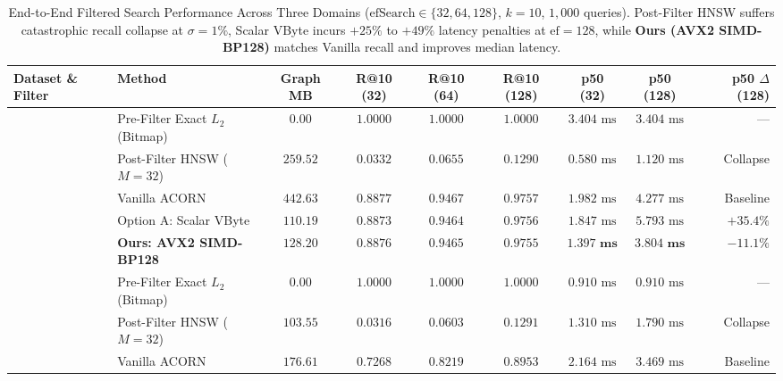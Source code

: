 \begin{table}[t]
\centering
\caption{End-to-End Filtered Search Performance Across Three Domains ($\text{efSearch} \in \{32, 64, 128\}$, $k=10$, $1{,}000$ queries). Post-Filter HNSW suffers catastrophic recall collapse at $\sigma=1\%$, Scalar VByte incurs $+25\%$ to $+49\%$ latency penalties at $\text{ef}=128$, while \textbf{Ours (AVX2 SIMD-BP128)} matches Vanilla recall and improves median latency.}
\label{tab:multidomain}
\small
\begin{tabular}{@{}llccccccr@{}}
\toprule
\textbf{Dataset \& Filter} & \textbf{Method} & \textbf{Graph MB} & \textbf{R@10 (32)} & \textbf{R@10 (64)} & \textbf{R@10 (128)} & \textbf{p50 (32)} & \textbf{p50 (128)} & \textbf{p50 $\Delta$ (128)} \\
\midrule
{}
 & Pre-Filter Exact $L_2$ (Bitmap) & $0.00$ & $1.0000$ & $1.0000$ & $1.0000$ & $3.404\text{ ms}$ & $3.404\text{ ms}$ & --- \\
 & Post-Filter HNSW ($M=32$) & $259.52$ & $0.0332$ & $0.0655$ & $0.1290$ & $0.580\text{ ms}$ & $1.120\text{ ms}$ & Collapse \\
 & Vanilla ACORN & $442.63$ & $0.8877$ & $0.9467$ & $0.9757$ & $1.982\text{ ms}$ & $4.277\text{ ms}$ & Baseline \\
 & Option A: Scalar VByte & $110.19$ & $0.8873$ & $0.9464$ & $0.9756$ & $1.847\text{ ms}$ & $5.793\text{ ms}$ & $+35.4\%$ \\
 & \textbf{Ours: AVX2 SIMD-BP128} & $\mathbf{128.20}$ & $\mathbf{0.8876}$ & $\mathbf{0.9465}$ & $\mathbf{0.9755}$ & $\mathbf{1.397\text{ ms}}$ & $\mathbf{3.804\text{ ms}}$ & $\mathbf{-11.1\%}$ \\
\midrule
{}
 & Pre-Filter Exact $L_2$ (Bitmap) & $0.00$ & $1.0000$ & $1.0000$ & $1.0000$ & $0.910\text{ ms}$ & $0.910\text{ ms}$ & --- \\
 & Post-Filter HNSW ($M=32$) & $103.55$ & $0.0316$ & $0.0603$ & $0.1291$ & $1.310\text{ ms}$ & $1.790\text{ ms}$ & Collapse \\
 & Vanilla ACORN & $176.61$ & $0.7268$ & $0.8219$ & $0.8953$ & $2.164\text{ ms}$ & $3.469\text{ ms}$ & Baseline \\

\end{tabular}
\end{table}
